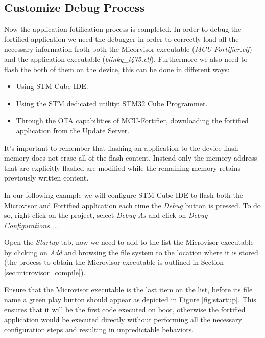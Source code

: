 \documentclass{article}
\begin{document}
\subsection{Customize Debug Process}
Now the application fotification process is completed. In order to debug the fortified application we need the debugger in order to correctly load all the necessary information froth both the Micorvisor executable (\textit{MCU-Fortifier.elf}) and the application executable (\textit{blinky\_l475.elf}).
Furthermore we also need to flash the both of them on the device, this can be done in different ways:
\begin{itemize}
	\item Using STM Cube IDE.
	\item Using the STM dedicated utility: STM32 Cube Programmer.
	\item Through the OTA capabilities of MCU-Fortifier, downloading the fortified application from the Update Server.
\end{itemize}
It's important to remember that flashing an application to the device flash memory does not erase all of the flash content. Instead only the memory address that are explicitly flashed are modified while the remaining memory retains previously written content.

In our following example we will configure STM Cube IDE to flash both the Microvisor and Fortified application each time the \textit{Debug} button is pressed. To do so, right click on the project, select \textit{Debug As} and click on \textit{Debug Configurations...}.

Open the \textit{Startup} tab, now we need to add to the list the Microvisor executable by clicking on \textit{Add} and browsing the file system to the location where it is stored (the process to obtain the Microvisor executable is outlined in Section \ref{sec:microvisor_compile}).

Ensure that the Microvisor executable is the last item on the list, before its file name a green play button should appear as depicted in Figure \ref{fig:startup}. This ensures that it will be the first code executed on boot, otherwise the fortified application would be executed directly without performing all the necessary configuration steps and resulting in unpredictable behaviors.
\end{document}
